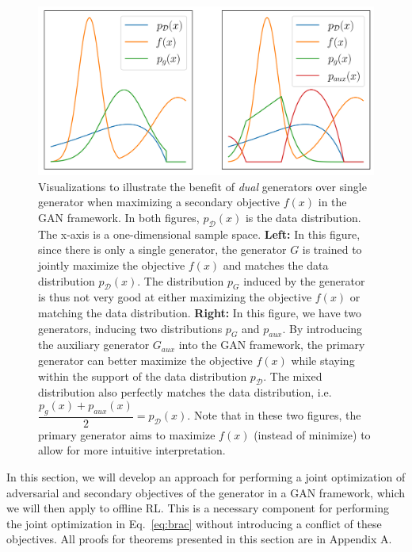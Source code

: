 \begin{figure}
  \begin{center}
    \includegraphics[width=\linewidth]{chapter_3/fig/single_and_dual.png}
  \end{center}
  \caption{Visualizations to illustrate the benefit of \textit{dual} generators over single generator when maximizing a secondary objective $f(x)$ in the GAN framework. In both figures, $p_\mathcal{D}(x)$ is the data distribution. The x-axis is a one-dimensional sample space. {\bf Left:} In this figure, since there is only a single generator, the generator $G$ is trained to jointly maximize the objective $f(x)$ and matches the data distribution $p_\mathcal{D}(x)$. The distribution $p_G$ induced by the generator is thus not very good at either maximizing the objective $f(x)$ or matching the data distribution. {\bf Right:} In this figure, we have two generators, inducing two distributions $p_G$ and $p_{aux}$. By introducing the auxiliary generator $G_{aux}$ into the GAN framework, the primary generator can better maximize the objective $f(x)$ while staying within the support of the data distribution $p_\mathcal{D}$. The mixed distribution also perfectly matches the data distribution, i.e. $ \dfrac{p_g(x) + p_{aux}(x)}{2} = p_{\mathcal{D}} (x) $. Note that in these two figures, the primary generator aims to maximize $f(x)$ (instead of minimize) to allow for more intuitive interpretation. }
  \label{fig:dual_gen_viz}
\end{figure}

In this section, we will develop an approach for performing a joint optimization of adversarial and secondary objectives of the generator in a GAN framework, which we will then apply to offline RL. This is a necessary component for performing the joint optimization in Eq.~\ref{eq:brac} without introducing a conflict of these objectives. All proofs for theorems presented in this section are in Appendix A.

